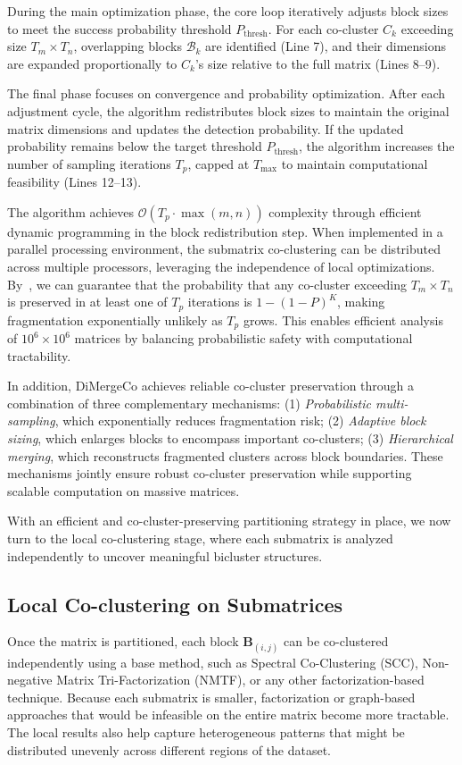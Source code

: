 \documentclass[journal]{IEEEtran}
\theoremstyle{definition}
\theoremstyle{remark} %
\begin{document}
During the main optimization phase, the core loop iteratively adjusts block sizes to meet the success probability threshold $P_{\text{thresh}}$. For each co-cluster $C_k$ exceeding size $T_m \times T_n$, overlapping blocks $\mathcal{B}_k$ are identified (Line 7), and their dimensions are expanded proportionally to $C_k$'s size relative to the full matrix (Lines 8--9).

The final phase focuses on convergence and probability optimization. After each adjustment cycle, the algorithm redistributes block sizes to maintain the original matrix dimensions and updates the detection probability. If the updated probability remains below the target threshold $P_{\text{thresh}}$, the algorithm increases the number of sampling iterations $T_p$, capped at $T_{\text{max}}$ to maintain computational feasibility (Lines 12--13).

The algorithm achieves $\mathcal{O}(T_p \cdot \max(m,n))$ complexity through efficient dynamic programming in the block redistribution step. When implemented in a parallel processing environment, the submatrix co-clustering can be distributed across multiple processors, leveraging the independence of local optimizations.
By~, we can guarantee that the probability that any co-cluster exceeding $T_m \times T_n$ is preserved in at least one of $T_p$ iterations is $1 - (1 - P)^K$, making fragmentation exponentially unlikely as $T_p$ grows. This enables efficient analysis of $10^6 \times 10^6$ matrices by balancing probabilistic safety with computational tractability.

    {\color{blue}
        In addition, DiMergeCo achieves reliable co-cluster preservation through a combination of three complementary mechanisms:
        (1) \emph{Probabilistic multi-sampling}, which exponentially reduces fragmentation risk;
        (2) \emph{Adaptive block sizing}, which enlarges blocks to encompass important co-clusters;
        (3) \emph{Hierarchical merging}, which reconstructs fragmented clusters across block boundaries.
        These mechanisms jointly ensure robust co-cluster preservation while supporting scalable computation on massive matrices.
    }

With an efficient and co-cluster-preserving partitioning strategy in place, we now turn to the local co-clustering stage, where each submatrix is analyzed independently to uncover meaningful bicluster structures.

\subsection{Local Co-clustering on Submatrices}
\label{subsec:local-co-clustering}
Once the matrix is partitioned, each block $\mathbf{B}_{(i,j)}$ can be co-clustered independently using a base method, such as Spectral Co-Clustering (SCC), Non-negative Matrix Tri-Factorization (NMTF), or any other factorization-based technique. Because each submatrix is smaller, factorization or graph-based approaches that would be infeasible on the entire matrix become more tractable. The local results also help capture heterogeneous patterns that might be distributed unevenly across different regions of the dataset.
\end{document}
